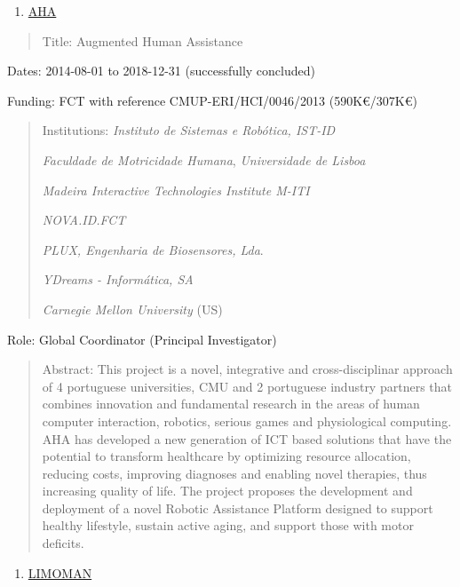 \begin{enumerate}
\def\labelenumi{\arabic{enumi}.}
\setcounter{enumi}{3}
\item
  \ul{AHA}
\end{enumerate}

\begin{quote}
Title: Augmented Human Assistance
\end{quote}

Dates: 2014-08-01 to 2018-12-31 (successfully concluded)

Funding: FCT with reference CMUP-ERI/HCI/0046/2013 (590K€/307K€)

\begin{quote}
Institutions: \emph{Instituto de Sistemas e Robótica, IST-ID}

\emph{Faculdade de Motricidade Humana}, \emph{Universidade de Lisboa}

\emph{Madeira Interactive Technologies Institute M-ITI}

\emph{NOVA.ID.FCT}

\emph{PLUX, Engenharia de Biosensores, Lda}.

\emph{YDreams - Informática, SA}

\emph{Carnegie Mellon University} (US)
\end{quote}

Role: Global Coordinator (Principal Investigator)

\begin{quote}
Abstract: This project is a novel, integrative and cross-disciplinar
approach of 4 portuguese universities, CMU and 2 portuguese industry
partners that combines innovation and fundamental research in the areas
of human computer interaction, robotics, serious games and physiological
computing. AHA has developed a new generation of ICT based solutions
that have the potential to transform healthcare by optimizing resource
allocation, reducing costs, improving diagnoses and enabling novel
therapies, thus increasing quality of life. The project proposes the
development and deployment of a novel Robotic Assistance Platform
designed to support healthy lifestyle, sustain active aging, and support
those with motor deficits.
\end{quote}

\begin{enumerate}
\def\labelenumi{\arabic{enumi}.}
\setcounter{enumi}{4}
\item
  \ul{LIMOMAN}
\end{enumerate}

